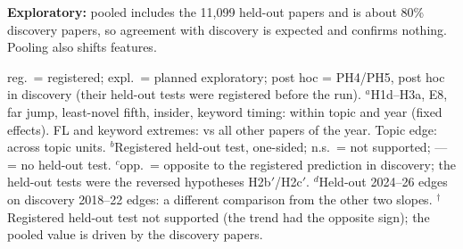 \vspace{0.5em}
\begin{minipage}{\linewidth}
  \scriptsize\raggedright
  \textbf{Exploratory:} pooled includes the 11,099 held-out papers and is about 80\% discovery papers, so agreement
  with discovery is expected and confirms nothing. Pooling also shifts features.\par
  \vspace{0.2em}\tiny
  reg.\ = registered; expl.\ = planned exploratory; post hoc = PH4/PH5, post hoc in discovery (their held-out tests
  were registered before the run).
  $^a$H1d--H3a, E8, far jump, least-novel fifth, insider, keyword timing: within topic and year (fixed effects). FL
  and keyword extremes: vs all other papers of the year. Topic edge: across topic units.
  $^b$Registered held-out test, one-sided; n.s.\ = not supported; --- = no held-out test.
  $^c$opp.\ = opposite to the registered prediction in discovery; the held-out tests were the reversed hypotheses
  H2b$'$/H2c$'$.
  $^d$Held-out 2024--26 edges on discovery 2018--22 edges: a different comparison from the other two slopes.
  $^\dagger$Registered held-out test not supported (the trend had the opposite sign); the pooled value is driven by
  the discovery papers.
\end{minipage}
